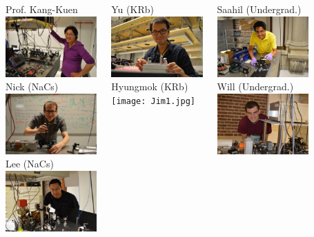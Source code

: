 \documentclass{beamer}
\begin{document}

\begin{frame}[t]
  \vspace{-0.8cm}
  \begin{columns}[t]
    \column{4cm}
    \begin{center}
      Prof. Kang-Kuen\\
      \includegraphics[width=3.5cm]{KangKuen.jpg}\\
      Nick (NaCs)\\
      \includegraphics[width=3.5cm]{Nick.jpg}\\
      Lee (NaCs)\\
      \includegraphics[width=3.5cm]{Lee.jpg}
    \end{center}
    \column{4cm}
    \begin{center}
      Yu (KRb)\\
      \includegraphics[width=3.5cm]{Yu.jpg}\\
      Hyungmok (KRb)\\
      \texttt{[image: Jim1.jpg]}
    \end{center}
    \column{4cm}
    \begin{center}
      Saahil (Undergrad.)\\
      \includegraphics[width=3.5cm]{Saahil.jpg}\\
      Will (Undergrad.)\\
      \includegraphics[width=3.5cm]{Will.jpg}
    \end{center}
  \end{columns}
\end{frame}
\end{document}
